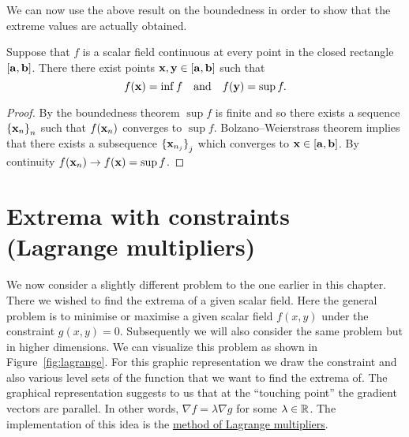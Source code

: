 We can now use the above result on the boundedness in order to show that the  extreme values are actually obtained.

\begin{theorem}
    Suppose that \(f\) is a scalar field continuous at every point in the closed rectangle \([\mathbf{a},\mathbf{b}]\).
    There there exist points \( \mathbf{x}, \mathbf{y} \in [\mathbf{a},\mathbf{b}]\) such that
    \[
        f(\mathbf{x}) = \inf f
        \quad \text{and} \quad
        f(\mathbf{y})= \sup f.
    \]
\end{theorem}

\begin{proof}
    By the boundedness theorem \(\sup f\) is finite and so there exists a sequence  \({\{\mathbf{x}_{n}\}}_{n}\)  such that \(f(\mathbf{x}_n)\) converges to \(\sup f\).
    Bolzano–Weierstrass theorem implies that there exists a subsequence  \({\{\mathbf{x}_{n_j}\}}_{j}\) which converges to \( \mathbf{x} \in [\mathbf{a},\mathbf{b}]\).
    By continuity \(f(\mathbf{x}_n) \to f(\mathbf{x}) = \sup f\).
\end{proof}




\section{Extrema with constraints (Lagrange multipliers)}

We now consider a slightly different problem to the one earlier in this chapter.
There we wished to find the extrema of a given scalar field.
Here the general problem is to minimise or maximise a given scalar field \(f(x,y)\) under the constraint \(g(x,y) = 0\).
Subsequently we will also consider the same problem but in higher dimensions.
We can visualize this problem as shown in Figure~\ref{fig:lagrange}.
For this graphic representation we draw the constraint and also various level sets of the function that we want to find the extrema of.
The graphical representation suggests to us that at the ``touching point'' the gradient vectors are parallel.
In other words, \(\nabla f = \lambda \nabla g\) for some \(\lambda \in \mathbb{R}\).
The implementation of this idea is the \href{https://en.wikipedia.org/wiki/Lagrange_multiplier}{method of Lagrange multipliers}.


